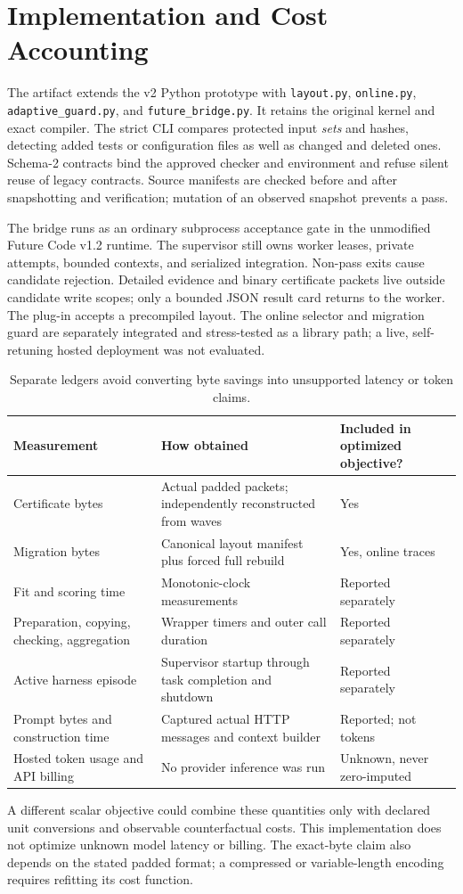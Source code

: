 \documentclass[11pt]{article}
\theoremstyle{definition}\newtheorem{definition}[theorem]{Definition}
\begin{document}
\section{Implementation and Cost Accounting}\label{sec:implementation}
The artifact extends the v2 Python prototype with \texttt{layout.py}, \texttt{online.py}, \texttt{adaptive\_guard.py}, and \texttt{future\_bridge.py}. It retains the original kernel and exact compiler. The strict CLI compares protected input \emph{sets} and hashes, detecting added tests or configuration files as well as changed and deleted ones. Schema-2 contracts bind the approved checker and environment and refuse silent reuse of legacy contracts. Source manifests are checked before and after snapshotting and verification; mutation of an observed snapshot prevents a pass.

The bridge runs as an ordinary subprocess acceptance gate in the unmodified Future Code v1.2 runtime. The supervisor still owns worker leases, private attempts, bounded contexts, and serialized integration. Non-pass exits cause candidate rejection. Detailed evidence and binary certificate packets live outside candidate write scopes; only a bounded JSON result card returns to the worker. The plug-in accepts a precompiled layout. The online selector and migration guard are separately integrated and stress-tested as a library path; a live, self-retuning hosted deployment was not evaluated.

\begin{table}[t]\centering\small
\caption{Separate ledgers avoid converting byte savings into unsupported latency or token claims.}
\begin{tabularx}{\linewidth}{@{}p{.27\linewidth}XX@{}}\toprule
Measurement & How obtained & Included in optimized objective?\\\midrule
Certificate bytes & Actual padded packets; independently reconstructed from waves & Yes\\
Migration bytes & Canonical layout manifest plus forced full rebuild & Yes, online traces\\
Fit and scoring time & Monotonic-clock measurements & Reported separately\\
Preparation, copying, checking, aggregation & Wrapper timers and outer call duration & Reported separately\\
Active harness episode & Supervisor startup through task completion and shutdown & Reported separately\\
Prompt bytes and construction time & Captured actual HTTP messages and context builder & Reported; not tokens\\
Hosted token usage and API billing & No provider inference was run & Unknown, never zero-imputed\\\bottomrule
\end{tabularx}
\end{table}
A different scalar objective could combine these quantities only with declared unit conversions and observable counterfactual costs. This implementation does not optimize unknown model latency or billing. The exact-byte claim also depends on the stated padded format; a compressed or variable-length encoding requires refitting its cost function.




\appendix

\end{document}
